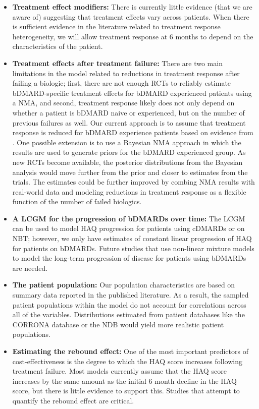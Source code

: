 \documentclass[11pt,final,fleqn]{article}\usepackage[]{graphicx}\usepackage[]{color}
\theoremstyle{plain}
\begin{document}
\begin{itemize}
\item \textbf{Treatment effect modifiers:} There is currently little evidence (that we are aware of) suggesting that treatment effects vary across patients. When there is sufficient evidence in the literature related to treatment response heterogeneity, we will allow treatment response at 6 months to depend on the characteristics of the patient.  
\item \textbf{Treatment effects after treatment failure:} There are two main limitations in the model related to reductions in treatment response after failing a biologic; first, there are not enough RCTs to reliably estimate bDMARD-specific treatment effects for bDMARD experienced patients using a NMA, and second, treatment response likely does not only depend on whether a patient is bDMARD naive or experienced, but on the number of previous failures as well. Our current approach is to assume that treatment response is reduced for bDMARD experience patients based on evidence from \citet{carlson2015economic}. One possible extension is to use a Bayesian NMA approach in which the \citet{carlson2015economic} results are used to generate priors for the bDMARD experienced group. As new RCTs become available, the posterior distributions from the Bayesian analysis would move further from the prior and closer to estimates from the trials. The estimates could be further improved by combing NMA results with real-world data and modeling reductions in treatment response as a flexible function of the number of failed biologics. 
\item \textbf{A LCGM for the progression of bDMARDs over time:} The LCGM can be used to model HAQ progression for patients using cDMARDs or on NBT; however, we only have estimates of constant linear progression of HAQ for patients on bDMARDs. Future studies that use non-linear mixture models to model the long-term progression of disease for patients using bDMARDs are needed. 
\item \textbf{The patient population:} Our population characteristics are based on summary data reported in the published literature. As a result, the sampled patient populations within the model do not account for correlations across all of the variables. Distributions estimated from patient databases like the CORRONA database or the NDB would yield more realistic patient populations. 
\item \textbf{Estimating the rebound effect:} One of the most important predictors of cost-effectiveness is the degree to which the HAQ score increases following treatment failure. Most models currently assume that the HAQ score increases by the same amount as the initial 6 month decline in the HAQ score, but there is little evidence to support this. Studies that attempt to quantify the rebound effect are critical. 
\end{itemize}
\end{document}
